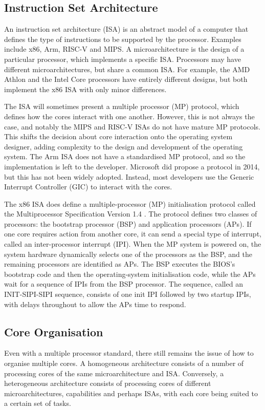 \documentclass[bsc,frontabs,singlespacing,parskip,deptreport]{infthesis}
\begin{document}
\subsection{Instruction Set Architecture} \label{architectural-challenges}
An instruction set architecture (ISA) is an abstract model of a computer that defines the type of instructions to be supported by the processor. Examples include x86, Arm, RISC-V and MIPS. A microarchitecture is the design of a particular processor, which implements a specific ISA. Processors may have different microarchitectures, but share a common ISA. For example, the AMD Athlon and the Intel Core processors have entirely different designs, but both implement the x86 ISA with only minor differences.

The ISA will sometimes present a multiple processor (MP) protocol, which defines how the cores interact with one another. However, this is not always the case, and notably the MIPS and RISC-V ISAs do not have mature MP protocols. This shifts the decision about core interaction onto the operating system designer, adding complexity to the design and development of the operating system. The Arm ISA does not have a standardised MP protocol, and so the implementation is left to the developer. Microsoft did propose a protocol in 2014, but this has not been widely adopted. Instead, most developers use the Generic Interrupt Controller (GIC) to interact with the cores.

The x86 ISA does define a multiple-processor (MP) initialisation protocol called the Multiprocessor Specification Version 1.4 \cite{intel-sys-prog-guide}. The protocol defines two classes of processors: the bootstrap processor (BSP) and application processors (APs). If one core requires action from another core, it can send a special type of interrupt, called an inter-processor interrupt (IPI). When the MP system is powered on, the system hardware dynamically selects one of the processors as the BSP, and the remaining processors are identified as APs. The BSP executes the BIOS’s bootstrap code and then the operating-system initialisation code, while the APs wait for a sequence of IPIs from the BSP processor. The sequence, called an INIT-SIPI-SIPI sequence, consists of one init IPI followed by two startup IPIs, with delays throughout to allow the APs time to respond.

\subsection{Core Organisation}
Even with a multiple processor standard, there still remains the issue of how to organise multiple cores. A homogeneous architecture consists of a number of processing cores of the same microarchitecture and ISA. Conversely, a heterogeneous architecture consists of processing cores of different microarchitectures, capabilities and perhaps ISAs, with each core being suited to a certain set of tasks.
\end{document}
